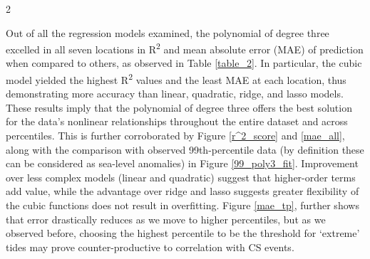 \documentclass[12pt]{article}
\begin{document}
\begin{multicols}{2}
    \begin{paragraph}
        \noindent Out of all the regression models examined, the polynomial of degree three excelled in all seven locations in R\textsuperscript{2} and mean absolute error (MAE) of prediction when compared to others, as observed in Table \ref{table_2}. In particular, the cubic model yielded the highest R\textsuperscript{2} values and the least MAE at each location, thus demonstrating more accuracy than linear, quadratic, ridge, and lasso models. These results imply that the polynomial of degree three offers the best solution for the data's nonlinear relationships throughout the entire dataset and across percentiles. This is further corroborated by Figure \ref{r^2_score} and \ref{mae_all}, along with the comparison with observed 99th-percentile data (by definition these can be considered as sea-level anomalies) in Figure \ref{99_poly3_fit}. Improvement over less complex models (linear and quadratic) suggest that higher-order terms add value, while the advantage over ridge and lasso suggests greater flexibility of the cubic functions does not result in overfitting. Figure \ref{mae_tp}, further shows that error drastically reduces as we move to higher percentiles, but as we observed before, choosing the highest percentile to be the threshold for `extreme' tides may prove counter-productive to correlation with CS events.
    \end{paragraph}

 


\end{multicols}
\end{document}
